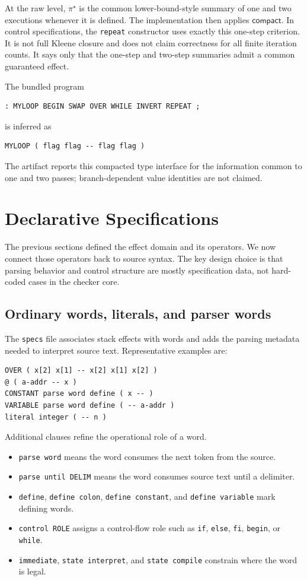 \documentclass[acmsmall,screen,review,anonymous,nonacm]{acmart}
\newcommand{\compact}{\mathsf{compact}}
\begin{document}
At the raw level, $\pi^\star$ is the common lower-bound-style summary of one and two
executions whenever it is defined. The implementation then applies $\compact$. In control
specifications, the \texttt{repeat} constructor uses exactly this one-step criterion. It
is not full Kleene closure and does not claim correctness for all finite iteration
counts. It says only that the one-step and two-step summaries admit a common guaranteed
effect.

The bundled program
\begin{lstlisting}
: MYLOOP BEGIN SWAP OVER WHILE INVERT REPEAT ;
\end{lstlisting}
is inferred as
\begin{lstlisting}
MYLOOP ( flag flag -- flag flag )
\end{lstlisting}
The artifact reports this compacted type interface for the information common to one
and two passes; branch-dependent value identities are not claimed.

\section{Declarative Specifications}
\label{sec:decl-specs}
The previous sections defined the effect domain and its operators. We now connect those operators back to source syntax. The key design choice is that parsing behavior and control structure are mostly specification data, not hard-coded cases in the checker core.

\subsection{Ordinary words, literals, and parser words}
The \texttt{specs} file associates stack effects with words and adds the parsing metadata needed to interpret source text. Representative examples are:
\begin{lstlisting}
OVER ( x[2] x[1] -- x[2] x[1] x[2] )
@ ( a-addr -- x )
CONSTANT parse word define ( x -- )
VARIABLE parse word define ( -- a-addr )
literal integer ( -- n )
\end{lstlisting}

Additional clauses refine the operational role of a word.
\begin{itemize}
\item \texttt{parse word} means the word consumes the next token from the source.
\item \texttt{parse until DELIM} means the word consumes source text until a delimiter.
\item \texttt{define}, \texttt{define colon}, \texttt{define constant}, and \texttt{define variable} mark defining words.
\item \texttt{control ROLE} assigns a control-flow role such as \texttt{if}, \texttt{else}, \texttt{fi}, \texttt{begin}, or \texttt{while}.
\item \texttt{immediate}, \texttt{state interpret}, and \texttt{state compile} constrain where the word is legal.
\end{itemize}
\end{document}
